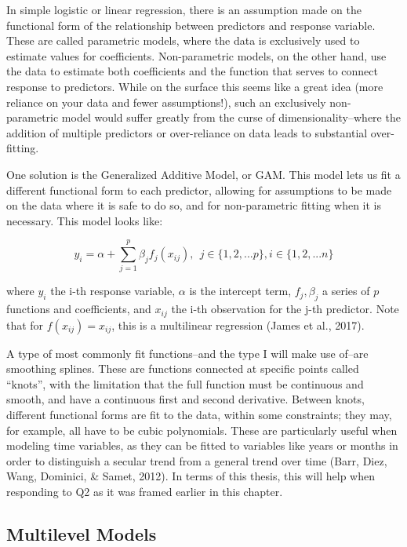 \documentclass[12pt,twoside]{reedthesis}
\begin{document}
  In simple logistic or linear regression, there is an assumption made on
  the functional form of the relationship between predictors and response
  variable. These are called parametric models, where the data is
  exclusively used to estimate values for coefficients. Non-parametric
  models, on the other hand, use the data to estimate both coefficients
  and the function that serves to connect response to predictors. While on
  the surface this seems like a great idea (more reliance on your data and
  fewer assumptions!), such an exclusively non-parametric model would
  suffer greatly from the curse of dimensionality--where the addition of
  multiple predictors or over-reliance on data leads to substantial
  over-fitting.
  
  One solution is the Generalized Additive Model, or GAM. This model lets
  us fit a different functional form to each predictor, allowing for
  assumptions to be made on the data where it is safe to do so, and for
  non-parametric fitting when it is necessary. This model looks like:
  
  \[y_i = \alpha + \sum_{j = 1}^p \beta_j f_j(x_{ij}), ~~j \in \{1,2,...p\}, i \in \{1,2,...n\} \]
  
  where \(y_i\) the i-th response variable, \(\alpha\) is the intercept
  term, \(f_j, \beta_j\) a series of \(p\) functions and coefficients, and
  \(x_{ij}\) the i-th observation for the j-th predictor. Note that for
  \(f(x_{ij}) = x_{ij}\), this is a multilinear regression (James et al.,
  2017).
  
  A type of most commonly fit functions--and the type I will make use
  of--are smoothing splines. These are functions connected at specific
  points called ``knots'', with the limitation that the full function must
  be continuous and smooth, and have a continuous first and second
  derivative. Between knots, different functional forms are fit to the
  data, within some constraints; they may, for example, all have to be
  cubic polynomials. These are particularly useful when modeling time
  variables, as they can be fitted to variables like years or months in
  order to distinguish a secular trend from a general trend over time
  (Barr, Diez, Wang, Dominici, \& Samet, 2012). In terms of this thesis,
  this will help when responding to Q2 as it was framed earlier in this
  chapter.
  
  \subsection{Multilevel Models}\label{multilevel-models}
  
\end{document}
